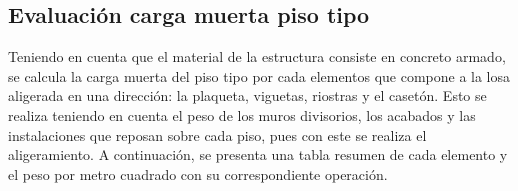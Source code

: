 \documentclass[12pt]{article}
\begin{document}
\subsection{Evaluación carga muerta piso tipo}

Teniendo en cuenta que el material de la estructura consiste en concreto armado, se calcula la carga muerta del piso tipo por cada  elementos que compone a la losa aligerada en una dirección: la plaqueta, viguetas, riostras y el casetón. Esto se realiza teniendo en cuenta el peso de los muros divisorios, los acabados y las instalaciones que reposan sobre cada piso, pues con este se realiza el aligeramiento. A continuación, se presenta una tabla resumen de cada elemento y el peso por metro cuadrado con su correspondiente operación.
\end{document}
